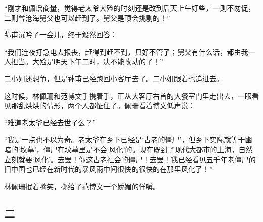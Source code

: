 \par “刚才和佩瑶商量，觉得老太爷大殓的时刻还是改到后天上午好些，一则不匆促，二则曾沧海舅父也可以赶到了。舅父是顶会挑剔的！”
\par 荪甫沉吟了一会儿，终于毅然回答：
\par “我们连夜打急电去报丧，赶得到赶不到，只好不管了；舅父有什么话，都由我一人担当。大殓是明天下午二时，决不能改动的了！”
\par 二小姐还想争，但是荪甫已经跑回小客厅去了。二小姐跟着也追进去。
\par 这时候，林佩珊和范博文手携着手，正从大客厅右首的大餐室门里走出去，一眼看见那乱烘烘的情形，两个人都怔住了。佩珊看着博文低声说：
\par “难道老太爷已经去世了么？”
\par “我是一点也不以为奇。老太爷在乡下已经是‘古老的僵尸’，但乡下实际就等于幽暗的‘坟墓’，僵尸在坟墓里是不会‘风化’的。现在既到了现代大都市的上海，自然立刻就要‘风化’。去罢！你这古老社会的僵尸！去罢！我已经看见五千年老僵尸的旧中国也已经在新时代的暴风雨中间很快的很快的在那里风化了！”
\par 林佩珊抿着嘴笑，掷给了范博文一个娇媚的佯嗔。



\subsection*{二}


